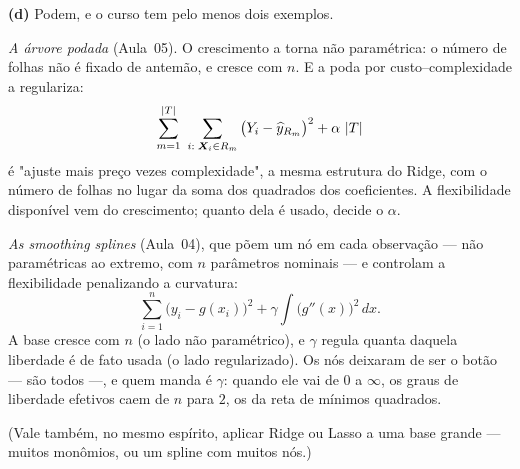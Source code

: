 \begin{solucao}
\smallskip
\textbf{(d)} Podem, e o curso tem pelo menos dois exemplos.

\emph{A árvore podada} (Aula~05). O crescimento a torna não paramétrica: o número de
folhas não é fixado de antemão, e cresce com $n$. E a poda por custo--complexidade a
regulariza:
\[
  \sum_{m=1}^{\left\lvert T \right\rvert}\ \sum_{i:\;\bm{X}_i\in R_m}\big(Y_i-\widehat y_{R_m}\big)^2+\alpha\,\left\lvert T \right\rvert
\]
é "ajuste mais preço vezes complexidade", a mesma estrutura do Ridge, com o número de
folhas no lugar da soma dos quadrados dos coeficientes. A flexibilidade disponível vem
do crescimento; quanto dela é usado, decide o $\alpha$.

\emph{As smoothing splines} (Aula~04), que põem um nó em cada observação --- não
paramétricas ao extremo, com $n$ parâmetros nominais --- e controlam a flexibilidade
penalizando a curvatura:
\[
  \sum_{i=1}^n\big(y_i-g(x_i)\big)^2+\gamma\int\big(g''(x)\big)^2\,dx .
\]
A base cresce com $n$ (o lado não paramétrico), e $\gamma$ regula quanta daquela
liberdade é de fato usada (o lado regularizado). Os nós deixaram de ser o botão ---
são todos ---, e quem manda é $\gamma$: quando ele vai de $0$ a $\infty$, os graus de
liberdade efetivos caem de $n$ para $2$, os da reta de mínimos quadrados.

(Vale também, no mesmo espírito, aplicar Ridge ou Lasso a uma base grande --- muitos
monômios, ou um spline com muitos nós.)
\end{solucao}
